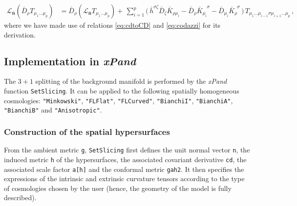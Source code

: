 \documentclass[notitlepage,onecolumn,floatfix,preprintnumbers,aps,prd,showpacs,nofootinbib,amsmath,amssymb,amsfonts]{revtex4-1}
\newcommand{\Lie}{\mathcal{L}}
\newcommand{\<}{\langle}
\renewcommand{\>}{\rangle}
\newcommand{\xPand}{{\em \lowercase{x}P\lowercase{and}}}
\begin{document}
\begin{align} \label{eq:commution_cov_lie}
	\Lie_{\bm{\bar n}} \left( \bar D_\rho T_{\mu_1 \dots \mu_p} \right) 
%
%
		& = 
		\bar D_\rho \left( \Lie_{\bm{\bar n}} T_{\mu_1 \dots \mu_p} \right) + \, 
		\sum_{i = 1}^{p} \big( \, \bar h^{\sigma \zeta} \bar D_\zeta \bar K_{\rho \mu_i} 
		- \bar D_\rho \bar K_{\mu_i}^{\phantom{\mu_i} \sigma} 
		- \bar D_{\mu_i} \bar K_\rho^{\phantom{\rho} \sigma} \, \big) \, T_{\mu_1 \dots \mu_{i-1} \sigma \mu_{i+1} \dots \mu_p} \, , 
\end{align}
where we have made use of relations \eqref{eq:cdtoCD} and \eqref{eq:codazzi} for its derivation. 

\subsection{Implementation in \xPand}

The $3+1$ splitting of the background manifold is performed by the \textit{xPand} function {\tt SetSlicing}. 
It can be applied to the following spatially homogeneous cosmologies: 
{\tt "Minkowski"}, {\tt "FLFlat"}, {\tt "FLCurved"}, {\tt "BianchiI"}, {\tt "BianchiA"}, {\tt "BianchiB"} and {\tt "Anisotropic"}. 

\subsubsection{Construction of the spatial hypersurfaces}

From the ambient metric {\tt g}, {\tt SetSlicing} first defines the unit normal vector {\tt n}, the induced metric {\tt h} 
of the hypersurfaces, the associated covariant derivative {\tt cd}, the associated scale factor {\tt a[h]} and the 
conformal metric {\tt gah2}. It then specifies the expressions of the intrinsic and extrinsic curvature tensors 
according to the type of cosmologies chosen by the user (hence, the geometry of the model is fully described). 
\end{document}
